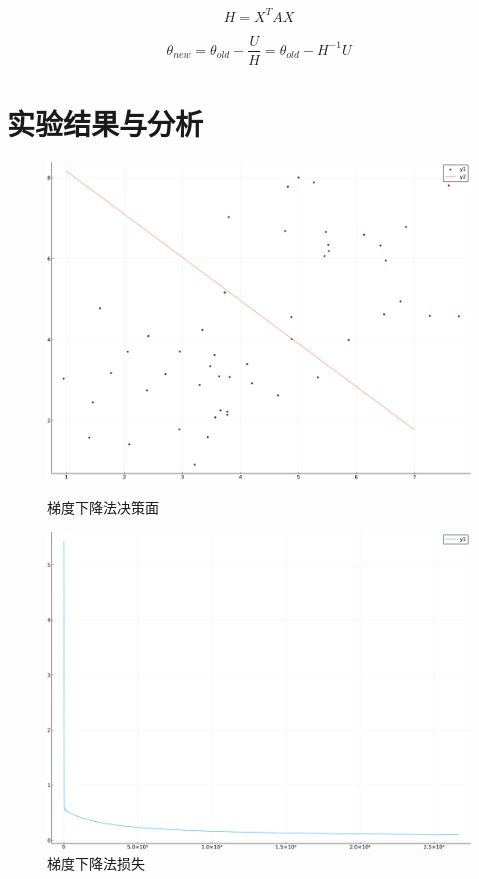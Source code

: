 \documentclass{ML}
\begin{document}
$$H = X^T A X$$

$$θ_{new}=θ_{old}-\frac{U}{H}=θ_{old}-{H}^{-1}{U}$$

\section{实验结果与分析}

\begin{figure}[H]
	\begin{minipage}[c]{0.5\linewidth}
		\centering
		\includegraphics[width=0.9\linewidth]{media/Logistic/grad-plot}
		\caption{梯度下降法决策面}
		\label{fig:grad-plot}
	\end{minipage}
	\begin{minipage}[c]{0.5\linewidth}
		\centering
		\includegraphics[width=0.9\linewidth]{media/Logistic/grad-loss}
		\caption{梯度下降法损失}
		\label{fig:grad-loss}
	\end{minipage}
\end{figure}
\end{document}
